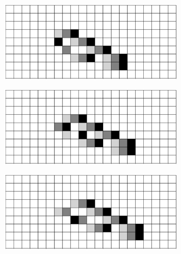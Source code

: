 \documentclass[12pt]{article}
\numberwithin{figure}{section} %
\begin{document}
\begin{figure}[H]
\begin{subfigure}{0.45\textwidth}
   	\end{subfigure}
	\newline
	\begin{subfigure}[t]{0.06\textwidth}
		\centering
		\phantom{H}
  	\end{subfigure}	
	\begin{subfigure}{0.45\textwidth}
     		\includegraphics[width=\linewidth]{Section4/35.6}
     		\subcaption{}
   	\end{subfigure}
    	\begin{subfigure}{0.45\textwidth}
     		\includegraphics[width=\linewidth]{Section4/35.7}
     		\subcaption{}
   	\end{subfigure}
	\newline
	\begin{subfigure}[t]{0.06\textwidth}
		\centering
		\phantom{H}
  	\end{subfigure}	
	\begin{subfigure}{0.45\textwidth}
     		\includegraphics[width=\linewidth]{Section4/35.8}

\end{subfigure}
\end{figure}
\end{document}
